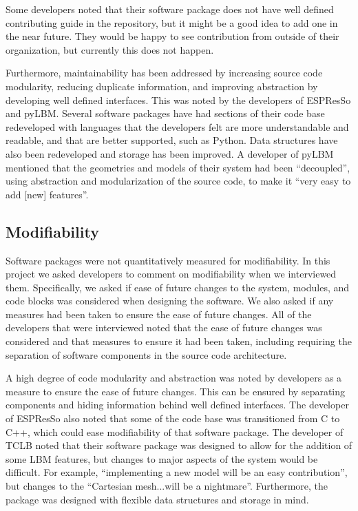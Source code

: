 \documentclass[final, 3p, times, authoryear]{elsarticle}
\begin{document}
Some developers noted that their software package does not have well defined
contributing guide in the repository, but it might be a good idea to add one in
the near future. They would be happy to see contribution from outside of their
organization, but currently this does not happen.

Furthermore, maintainability has been addressed by increasing source code
modularity, reducing duplicate information, and improving abstraction by
developing well defined interfaces. This was noted by the developers of ESPResSo
and pyLBM. Several software packages have had sections of their code base
redeveloped with languages that the developers felt are more understandable and
readable, and that are better supported, such as Python. Data structures have
also been redeveloped and storage has been improved. A developer of pyLBM
mentioned that the geometries and models of their system had been ``decoupled'',
using abstraction and modularization of the source code, to make it ``very easy
to add [new] features''.

\subsection{Modifiability}

Software packages were not quantitatively measured for modifiability. In this
project we asked developers to comment on modifiability when we interviewed
them. Specifically, we asked if ease of future changes to the system, modules,
and code blocks was considered when designing the software. We also asked if any
measures had been taken to ensure the ease of future changes. All of the
developers that were interviewed noted that the ease of future changes was
considered and that measures to ensure it had been taken, including requiring
the separation of software components in the source code architecture.

A high degree of code modularity and abstraction was noted by developers as a
measure to ensure the ease of future changes. This can be ensured by separating
components and hiding information behind well defined interfaces. The developer
of ESPResSo also noted that some of the code base was transitioned from C to
C++, which could ease modifiability of that software package. The developer of
TCLB noted that their software package was designed to allow for the addition of
some LBM features, but changes to major aspects of the system would be
difficult. For example, ``implementing a new model will be an easy
contribution'', but changes to the ``Cartesian mesh...will be a nightmare''.
Furthermore, the package was designed with flexible data structures and storage
in mind. 
\end{document}
